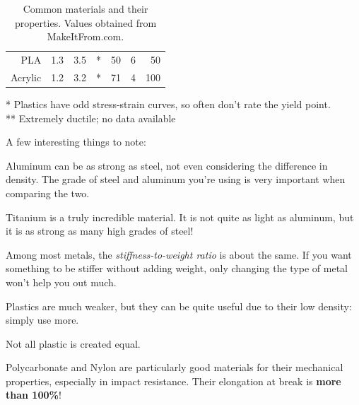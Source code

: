\begin{table}[H]
\begin{tabular}{rrrrrrr}
PLA                                                                            & 1.3                                                                                                          & 3.5                                                                                           & *                                                                                      & 50                                                                                   & 6                                                                                         & 50                                                                                            \\
Acrylic                                                                        & 1.2                                                                                                          & 3.2                                                                                           & *                                                                                      & 71                                                                                   & 4                                                                                           & 100                                                                                          
\end{tabular}
* Plastics have odd stress-strain curves, so often don't rate the yield point. \\
** Extremely ductile; no data available
\caption{Common materials and their properties. Values obtained from MakeItFrom.com.}
 \label{table:materials}
\end{table}

A few interesting things to note:
\begin{asparaenum}[a)]
	\item Aluminum can be as strong as steel, not even considering the difference in density. The grade of steel and aluminum you're using is very important when comparing the two.
	\item Titanium is a truly incredible material. It is not quite as light as aluminum, but it is as strong as many high grades of steel!
	\item Among most metals, the \textit{stiffness-to-weight ratio} is about the same. If you want something to be stiffer without adding weight, only changing the type of metal won't help you out much.
	\item Plastics are much weaker, but they can be quite useful due to their low density: simply use more.
	\item Not all plastic is created equal.
	\item Polycarbonate and Nylon are particularly good materials for their mechanical properties, especially in impact resistance. Their elongation at break is \textbf{more than 100\%}!
\end{asparaenum}

